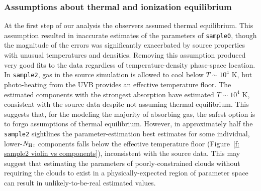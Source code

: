 \documentclass[fleqn,usenatbib]{mnras}
\newcommand{\todo}[1]{\textcolor{Maroon}{\textbf{Address: #1}}}
\newcommand{\NHI}{N_{\ion{H}{I}}}
\begin{document}

\subsubsection{Assumptions about thermal and ionization equilibrium}

At the first step of our analysis the observers assumed thermal equilibrium.
This assumption resulted in inaccurate estimates of the parameters of \texttt{sample0}, though the magnitude of the errors was significantly exacerbated by source properties with unusual temperatures and densities.
Removing this assumption produced very good fits to the data regardless of temperature-density phase-space location.
In \texttt{sample2}, gas in the source simulation is allowed to cool below $T \sim 10^4$ K,
but photo-heating from the UVB provides an effective temperature floor.
The estimated components with the strongest absorption have estimated $T \sim 10^4$ K,
consistent with the source data despite not assuming thermal equilibrium.
This suggests that, for the modeling the majority of absorbing gas, the safest option is to forgo assumptions of thermal equilibrium.
However, in approximately half the \texttt{sample2} sightlines the parameter-estimation best estimates for some individual, lower-$N_{\ion{H}{I}}$ components falls below the effective temperature floor (Figure~\ref{f: sample2 violin vs components}),
inconsistent with the source data.
This may suggest that estimating the parameters of poorly-constrained clouds without requiring the clouds to exist in a physically-expected region of parameter space can result in unlikely-to-be-real estimated values.
\end{document}
